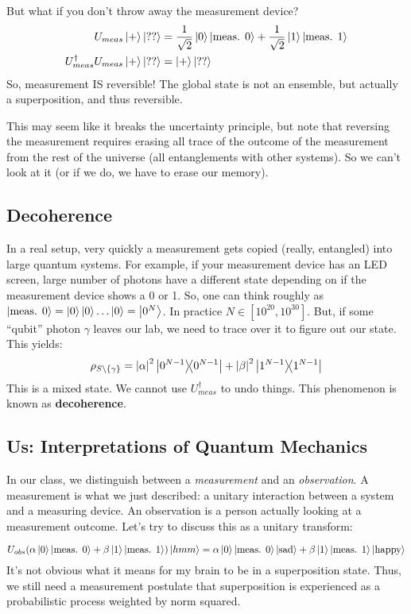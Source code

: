 But what if you don't throw away the measurement device?
\begin{align*}
    U_{meas} \ket{+} \ket{??} &= \frac{1}{\sqrt{2}} \ket{0} \ket{\text{meas. } 0} + \frac{1}{\sqrt{2}} \ket{1} \ket{\text{meas. } 1} \\
    U_{meas}^{\dagger} U_{meas} \ket{+} \ket{??} &= \ket{+} \ket{??}
\end{align*}
So, measurement IS reversible! The global state is not an ensemble, but actually a superposition, and thus reversible.

This may seem like it breaks the uncertainty principle,
but note that reversing the measurement requires erasing all trace of the outcome of the measurement from the rest of the universe
(all entanglements with other systems). So we can't look at it (or if we do, we have to erase our memory).

\subsection{Decoherence}
In a real setup, very quickly a measurement gets copied (really, entangled) into large quantum systems. For example, if your measurement device has an LED screen,
large number of photons have a different state depending on if the measurement device shows a 0 or 1.
So, one can think roughly as $\ket{\text{meas. } 0} = \ket{0}\ket{0}\dots \ket{0} = \ket{0^N}$. In practice $N \in [10^{20}, 10^{30}]$. But, if some ``qubit'' photon $\gamma$ leaves our lab,
we need to trace over it to figure out our state. This yields:
\[ \rho_{S\setminus \{ \gamma\}} = \qty|\alpha|^2 \ketbra{0^{N - 1}} + \qty|\beta|^2 \ketbra{1^{N - 1}} \]
This is a mixed state. We cannot use $U_{meas}^{\dagger}$ to undo things.
This phenomenon is known as \textbf{decoherence}.

\subsection{Us: Interpretations of Quantum Mechanics}
In our class, we distinguish between a \emph{measurement} and an \emph{observation}. A measurement is what we just described: a unitary interaction between a system and a measuring device.
An observation is a person actually looking at a measurement outcome. Let's try to discuss this as a unitary transform:

\[ U_{obs} \qty(\alpha \ket{0} \ket{\text{meas. } 0} + \beta\ket{1} \ket{\text{meas. } 1}) \ket{hmm} =  \alpha \ket{0} \ket{\text{meas. } 0} \ket{\text{sad}} + \beta\ket{1} \ket{\text{meas. } 1} \ket{\text{happy}}  \]
It's not obvious what it means for my brain to be in a superposition state. Thus, we still need a measurement postulate that superposition is experienced as a probabilistic process weighted by norm squared.

